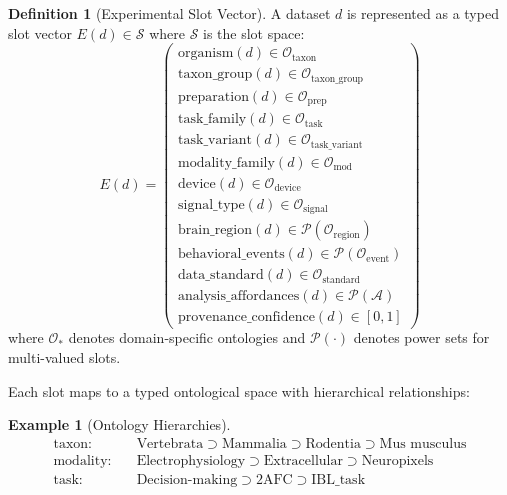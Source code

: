 \documentclass{article}
\theoremstyle{definition}
\newtheorem{definition}{Definition}[section]
\newtheorem{example}{Example}[section]
\begin{document}
\begin{definition}[Experimental Slot Vector]
\label{def:slot-vector}
A dataset $d$ is represented as a typed slot vector $E(d) \in \mathcal{S}$ where $\mathcal{S}$ is the slot space:
\begin{equation}
E(d) = \begin{pmatrix}
    \text{organism}(d) \in \mathcal{O}_{\text{taxon}} \\
    \text{taxon\_group}(d) \in \mathcal{O}_{\text{taxon\_group}} \\
    \text{preparation}(d) \in \mathcal{O}_{\text{prep}} \\
    \text{task\_family}(d) \in \mathcal{O}_{\text{task}} \\
    \text{task\_variant}(d) \in \mathcal{O}_{\text{task\_variant}} \\
    \text{modality\_family}(d) \in \mathcal{O}_{\text{mod}} \\
    \text{device}(d) \in \mathcal{O}_{\text{device}} \\
    \text{signal\_type}(d) \in \mathcal{O}_{\text{signal}} \\
    \text{brain\_region}(d) \in \mathcal{P}(\mathcal{O}_{\text{region}}) \\
    \text{behavioral\_events}(d) \in \mathcal{P}(\mathcal{O}_{\text{event}}) \\
    \text{data\_standard}(d) \in \mathcal{O}_{\text{standard}} \\
    \text{analysis\_affordances}(d) \in \mathcal{P}(\mathcal{A}) \\
    \text{provenance\_confidence}(d) \in [0, 1]
\end{pmatrix}
\end{equation}
where $\mathcal{O}_*$ denotes domain-specific ontologies and $\mathcal{P}(\cdot)$ denotes power sets for multi-valued slots.
\end{definition}

Each slot maps to a typed ontological space with hierarchical relationships:

\begin{example}[Ontology Hierarchies]
\begin{align*}
    \text{taxon}: & \quad \text{Vertebrata} \supset \text{Mammalia} \supset \text{Rodentia} \supset \text{Mus musculus} \\
    \text{modality}: & \quad \text{Electrophysiology} \supset \text{Extracellular} \supset \text{Neuropixels} \\
    \text{task}: & \quad \text{Decision-making} \supset \text{2AFC} \supset \text{IBL\_task}
\end{align*}
\end{example}
\end{document}
